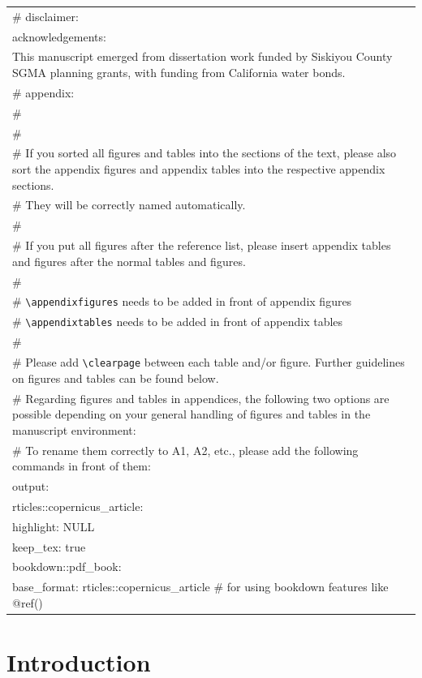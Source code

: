 \documentclass[
]{article}
\begin{document}
\begin{longtable}[]{@{}l@{}}
\# disclaimer: \textbar{} \\
acknowledgements: \textbar{} \\
This manuscript emerged from dissertation work funded by Siskiyou County
SGMA planning grants, with funding from California water bonds. \\
\# appendix: \textbar{} \\
\# \\
\# \\
\# If you sorted all figures and tables into the sections of the text,
please also sort the appendix figures and appendix tables into the
respective appendix sections. \\
\# They will be correctly named automatically. \\
\# \\
\# If you put all figures after the reference list, please insert
appendix tables and figures after the normal tables and figures. \\
\# \\
\# \texttt{\textbackslash{}appendixfigures} needs to be added in front
of appendix figures \\
\# \texttt{\textbackslash{}appendixtables} needs to be added in front of
appendix tables \\
\# \\
\# Please add \texttt{\textbackslash{}clearpage} between each table
and/or figure. Further guidelines on figures and tables can be found
below. \\
\# Regarding figures and tables in appendices, the following two options
are possible depending on your general handling of figures and tables in
the manuscript environment: \\
\# To rename them correctly to A1, A2, etc., please add the following
commands in front of them: \\
output: \\
rticles::copernicus\_article: \\
highlight: NULL \\
keep\_tex: true \\
bookdown::pdf\_book: \\
base\_format: rticles::copernicus\_article \# for using bookdown
features like @ref() \\
\bottomrule()
\end{longtable}

\hypertarget{introduction}{%
\section{Introduction}\label{introduction}}
\end{document}
